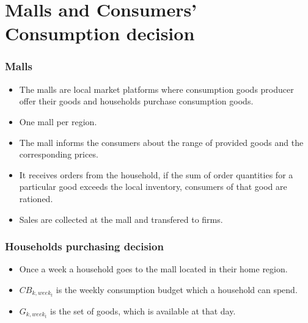 \documentclass{beamer}
\begin{document}
\section{Malls and Consumers' Consumption decision}

\frame
{

  \frametitle{Malls} 
\begin{itemize}

\item The malls are local market platforms where consumption goods producer offer their goods and households purchase consumption goods.
\item One mall per region.
\item The mall informs the consumers about the range of provided goods and the corresponding prices.
\item It receives  orders from the household, if the sum of order quantities for a particular good exceeds the local inventory, consumers of that good are rationed.
\item Sales are collected at the mall and transfered to firms. 
  

\end{itemize}



  
}

\frame
{

  \frametitle{Households purchasing decision} 
\begin{itemize}

\item Once a week a household goes to the  mall located in their home region.

\item $CB_{k,week_t}$ is the weekly consumption budget which a household can spend. 

\item $G_{k,week_t}$ is the set of goods, which is available at that day.


\end{itemize}

  
}
\end{document}
